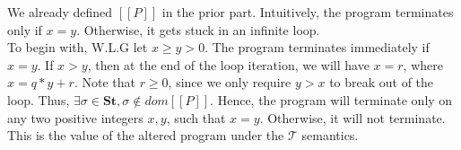 \documentclass{article}
\begin{document}
\begin{enumerate}
\begin{itemize}
\begin{itemize}
	We already defined $[[ P ]]$ in the prior part. Intuitively, the program
	terminates only if $x = y$. Otherwise, it gets stuck in an infinite	loop.\\
		
	To begin with, W.L.G let $ x \geq y > 0$. The program terminates
	immediately if $x = y$. If $x > y$, then at the end of the loop iteration,
	we will have $x = r$, where $x = q * y + r$. Note that $r \geq 0$, since we
	only require $y > x$ to break out of the loop. 
	Thus, $\exists \sigma \in \textbf{St}, \sigma \notin dom[[ P ]]$.
	Hence, the program will terminate only on any two positive integers $x, y$,
	such that $x = y$. Otherwise, it will not terminate.
	This is the value of the altered program under the $\mathcal{T}$ semantics.
	
	\end{itemize}		

\end{itemize}

\end{enumerate}
\end{document}
